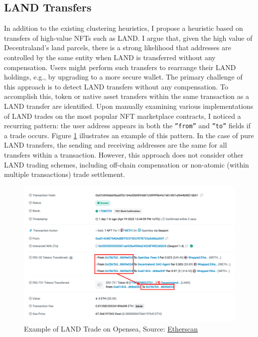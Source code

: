 \documentclass[12pt,a4paper,titlepage,oneside,english]{article}
\begin{document}
\subsection{LAND Transfers}
In addition to the existing clustering heuristics, I propose a heuristic based on transfers of high-value NFTs such as LAND. I argue that, given the high value of Decentraland's land parcels, there is a strong likelihood that addresses are controlled by the same entity when LAND is transferred without any compensation. Users might perform such transfers to rearrange their LAND holdings, e.g., by upgrading to a more secure wallet. \newline
The primary challenge of this approach is to detect LAND transfers without any compensation. To accomplish this, token or native asset transfers within the same transaction as a LAND transfer are identified. Upon manually examining various implementations of LAND trades on the most popular NFT marketplace contracts, I noticed a recurring pattern: the user address appears in both the \texttt{''from''} and \texttt{''to''} fields if a trade occurs. Figure \ref{fig:LAND_example} illustrates an example of this pattern. 
In the case of pure LAND transfers, the sending and receiving addresses are the same for all transfers within a transaction. However, this approach does not consider other LAND trading schemes, including off-chain compensation or non-atomic (within multiple transactions) trade settlement.

\begin{figure}[h!]
	\centering
	\includegraphics[width=\textwidth]{./figures/etherscan-opensea.png}
	\caption{Example of LAND Trade on Opensea, Source: \href{https://etherscan.io/tx/0x2c2a70114e9080596bf5da6ad9c9b9f6d7e4c85a9d3b06e992f7248f9457a2ec}{Etherscan}}
	\label{fig:LAND_example}
\end{figure}
\end{document}
